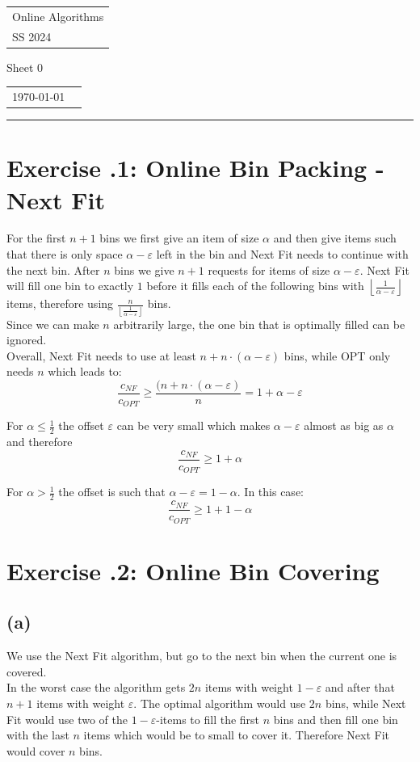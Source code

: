 \documentclass[a4paper,12pt]{scrartcl}
\newcommand{\mal}{\cdot}
\renewcommand{\epsilon}{\varepsilon}
\newcounter{sheet}
\newcommand{\printsheet}{\arabic{sheet}}
\newcommand{\printmembers}{}
\begin{document}
{\raggedright
\begin{tabular}{l}
    Online Algorithms \\
    SS 2024 \\
\end{tabular}}
\hfill
{\Large Sheet 0\printsheet}
\hfill
\begin{tabular}{l l}
\today{} \\
\printmembers
\end{tabular}
\hrule



\section*{Exercise \printsheet.1: Online Bin Packing - Next Fit}
For the first $n+1$ bins we first give an item of size $\alpha$ and then give items such that there is only space $\alpha-\varepsilon$ left in the bin and Next Fit needs to continue with the next bin. After $n$ bins we give $n+1$ requests for items of size $\alpha-\varepsilon$. Next Fit will fill one bin to exactly $1$ before it fills each of the following bins with $\left\lfloor \frac{1}{\alpha-\epsilon} \right\rfloor$ items, therefore using  $\frac{n}{\left\lfloor\frac{1}{\alpha-\epsilon}\right\rfloor}$ bins. \\

Since we can make $n$ arbitrarily large, the one bin that is optimally filled can be ignored. \\
Overall, Next Fit needs to use at least $n+n\mal (\alpha-\epsilon)$ bins, while OPT only needs $n$ which leads to: 
\[\frac{c_{NF}}{c_{OPT}} \geq \frac{(n + n \mal (\alpha-\epsilon)}{n} = 1+ \alpha -\epsilon \] 

For $\alpha \leq \frac{1}{2}$ the offset $\epsilon$ can be very small which makes $\alpha - \epsilon$ almost as big as $\alpha$ and therefore
\[\frac{c_{NF}}{c_{OPT}} \geq 1 + \alpha \] %

For $\alpha > \frac{1}{2}$ the offset is such that $\alpha - \epsilon = 1-\alpha$. In this case: 
\[\frac{c_{NF}}{c_{OPT}} \geq 1+ 1-\alpha\]

\section*{Exercise \printsheet.2: Online Bin Covering}
\subsection*{(a)}
We use the Next Fit algorithm, but go to the next bin when the current one is covered. \\
In the worst case the algorithm gets $2n$ items with weight $1-\epsilon$ and after that $n+1$ items with weight $\epsilon$. The optimal algorithm would use $2n$ bins, while Next Fit would use two of the $1-\epsilon$-items to fill the first $n$ bins and then fill one bin with the last $n$ items which would be to small to cover it. Therefore Next Fit would cover $n$ bins.
\end{document}
